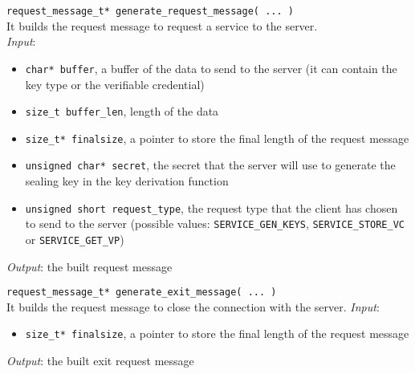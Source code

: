 \noindent
\texttt{request\_message\_t* generate\_request\_message( ... )}\\
It builds the request message to request a service to the server. \\
\textit{Input}:
\begin{itemize}[noitemsep,nolistsep]
  \item \texttt{char* buffer}, a buffer of the data to send to the server (it can contain the key type or the verifiable credential)
  \item \texttt{size\_t buffer\_len}, length of the data
  \item \texttt{size\_t* finalsize}, a pointer to store the final length of the request message
  \item \texttt{unsigned char* secret}, the secret that the server will use to generate the sealing key in the key derivation function
  \item \texttt{unsigned short request\_type}, the request type that the client has chosen to send to the server (possible values: \texttt{SERVICE\_GEN\_KEYS}, \texttt{SERVICE\_STORE\_VC} or \texttt{SERVICE\_GET\_VP})
\end{itemize}
\textit{Output}: the built request message


\noindent
\texttt{request\_message\_t* generate\_exit\_message( ... )}\\
It builds the request message to close the connection with the server.
\textit{Input}:
\begin{itemize}[noitemsep,nolistsep]
  \item \texttt{size\_t* finalsize}, a pointer to store the final length of the request message
\end{itemize}
\textit{Output}: the built exit request message



   


